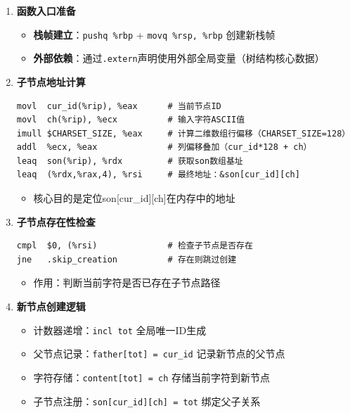 \documentclass[10pt,a4paper]{article}
\begin{document}
\begin{enumerate}
    \item \textbf{函数入口准备}
    \begin{itemize}
        \item \textbf{栈帧建立}：\verb|pushq %rbp| + \verb|movq %rsp, %rbp| 创建新栈帧
        \item \textbf{外部依赖}：通过\verb|.extern|声明使用外部全局变量（树结构核心数据）
    \end{itemize}
    
    \item \textbf{子节点地址计算}
    \begin{lstlisting}[language={[x86masm]Assembler}]
movl  cur_id(%rip), %eax      # 当前节点ID
movl  ch(%rip), %ecx          # 输入字符ASCII值
imull $CHARSET_SIZE, %eax     # 计算二维数组行偏移（CHARSET_SIZE=128）
addl  %ecx, %eax              # 列偏移叠加（cur_id*128 + ch）
leaq  son(%rip), %rdx         # 获取son数组基址
leaq  (%rdx,%rax,4), %rsi     # 最终地址：&son[cur_id][ch]
    \end{lstlisting}
    \begin{itemize}
        \item 核心目的是定位son[cur\_id][ch]在内存中的地址
    \end{itemize}
    
    \item \textbf{子节点存在性检查}
    \begin{lstlisting}[language={[x86masm]Assembler}]
cmpl  $0, (%rsi)              # 检查子节点是否存在
jne   .skip_creation          # 存在则跳过创建
    \end{lstlisting}
    \begin{itemize}
        \item 作用：判断当前字符是否已存在子节点路径
    \end{itemize}
    
    \item \textbf{新节点创建逻辑}
    \begin{itemize}
        \item 计数器递增：\verb|incl tot| 全局唯一ID生成
        \item 父节点记录：\verb|father[tot] = cur_id| 记录新节点的父节点
        \item 字符存储：\verb|content[tot] = ch| 存储当前字符到新节点
        \item 子节点注册：\verb|son[cur_id][ch] = tot| 绑定父子关系
    \end{itemize}
    

\end{enumerate}
\end{document}

